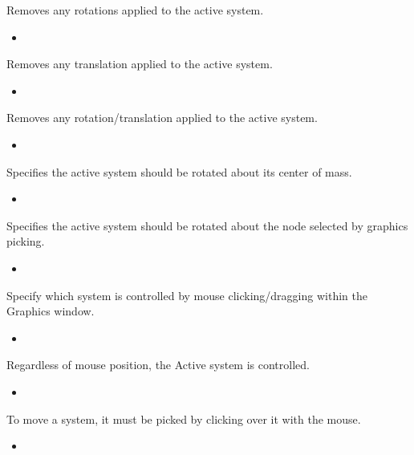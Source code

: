 \documentclass[letterpaper,11pt,english]{sphinxmanual}
\begin{document}
Removes any rotations applied to the active system.
\begin{itemize}
\item {} 

\end{itemize}

Removes any translation applied to the active system.
\begin{itemize}
\item {} 

\end{itemize}

Removes any rotation/translation applied to the active system.
\begin{itemize}
\item {} 

\end{itemize}

Specifies the active system should be rotated about its center of mass.
\begin{itemize}
\item {} 

\end{itemize}

Specifies the active system should be rotated about the node selected by graphics picking.
\begin{itemize}
\item {} 

\end{itemize}

Specify which system is controlled by mouse clicking/dragging within the Graphics window.
\begin{itemize}
\item {} 

\end{itemize}

Regardless of mouse position, the Active system is controlled.
\begin{itemize}
\item {} 

\end{itemize}

To move a system, it must be picked by clicking over it with the mouse.
\begin{itemize}
\item {} 

\end{itemize}
\end{document}
